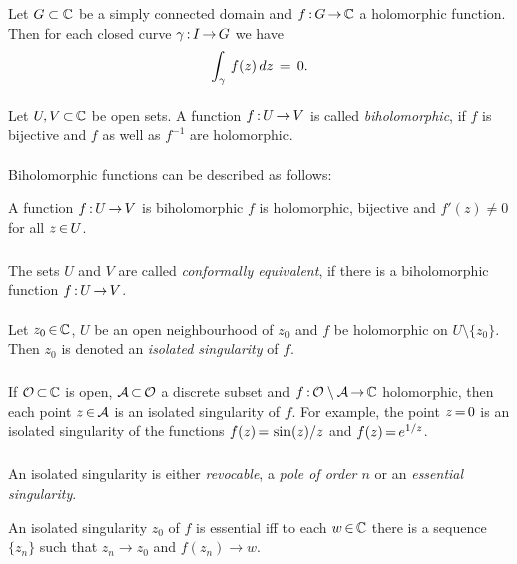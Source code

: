 \documentclass[11pt,twoside]{article}
\begin{document}
\begin{theorem}
Let $\G \subset \C$ be a simply connected domain
and $f \: \G \xto \C$ a holomorphic function.
Then for each closed curve $\gamma \:I \xto \G$ we have
\[
\int_{\gamma} \, f(z) \, dz \= 0.
\]
\end{theorem}

\paragraph{}
Let $U,V \xsubset \C$ be open sets.
A function $f \:U \xto V$ is called \textit{biholomorphic},
if $f$ is bijective and $f$ as well as $f^{-1}$ are holomorphic.

\paragraph{}
Biholomorphic functions can be described as follows:

\begin{theorem}
A function $f \: U \xto V$ is biholomorphic
\iff
$f$ is holomorphic, bijective and $f'(z) \neq 0$ for all $z \xeof U$.
\end{theorem}

\subparagraph{}
The sets $U$ and $V$ are called \textit{conformally equivalent},
if there is a biholomorphic function $f \: U \xto V$.

\paragraph{}
Let $z_0 \xeof \C$, $U$ be an open neighbourhood of $z_0$ and
$f$ be holomorphic on $U \setminus \{z_0\}$.
Then $z_0$ is denoted an \textit{isolated singularity} of $f$.

\subparagraph{}
If $\openO \xsubset \C$ is open,
$\A \xsubset \openO$ a discrete subset
and $f \: \openO \setminus \A \xto \C$ holomorphic,
then each point $z \xeof \A$ is an isolated singularity of $f$.
For example,
the point $z \eq 0$ is an isolated singularity of the functions
$f(z) \eq \sin(z)/z$ and $f(z) \eq e^{1/z}$.

\subparagraph{}
An isolated singularity is either \textit{revocable},
a \textit{pole of order $n$} or an \textit{essential singularity}.

\begin{theorem}
An isolated singularity $z_0$ of $f$ is essential
iff
to each $w \xeof \C$ there is a sequence $\{z_n\}$
such that
$z_n \rightarrow z_0$ and $f(z_n) \rightarrow w$.
\end{theorem}
\end{document}
